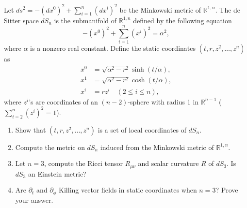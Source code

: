 \begin{exercise}
\label{physics:2024:5}
Let $ds^2 = -(dx^0)^2 + \sum_{i=1}^n (dx^i)^2$ be the Minkowski metric of $\mathbb{R}^{1,n}$. The de Sitter space $dS_n$ is the submanifold of $\mathbb{R}^{1,n}$ defined by the following equation
\begin{equation}
    -(x^0)^2 + \sum_{i=1}^n (x^i)^2 = \alpha^2, \label{eq:2024:5:10}
\end{equation}
where $\alpha$ is a nonzero real constant. Define the static coordinates $(t, r, z^2, \dots, z^n)$ as
\begin{align*}
    x^0 &= \sqrt{\alpha^2 - r^2} \sinh(t/\alpha), \\
    x^1 &= \sqrt{\alpha^2 - r^2} \cosh(t/\alpha), \label{eq:2024:5:11} \\
    x^i &= r z^i \quad (2 \le i \le n),
\end{align*}
where $z^i$'s are coordinates of an $(n-2)$-sphere with radius 1 in $\mathbb{R}^{n-1}$ ($\sum_{i=2}^n (z^i)^2 = 1$).

\begin{enumerate}[label=(\alph*)]
    \item Show that $(t, r, z^2, \dots, z^n)$ is a set of local coordinates of $dS_n$.
    \item Compute the metric on $dS_n$ induced from the Minkowski metric of $\mathbb{R}^{1,n}$.
    \item Let $n=3$, compute the Ricci tensor $R_{\mu\nu}$ and scalar curvature $R$ of $dS_3$. Is $dS_3$ an Einstein metric?
    \item Are $\partial_t$ and $\partial_\phi$ Killing vector fields in static coordinates when $n=3$? Prove your answer.
\end{enumerate}
\end{exercise}

